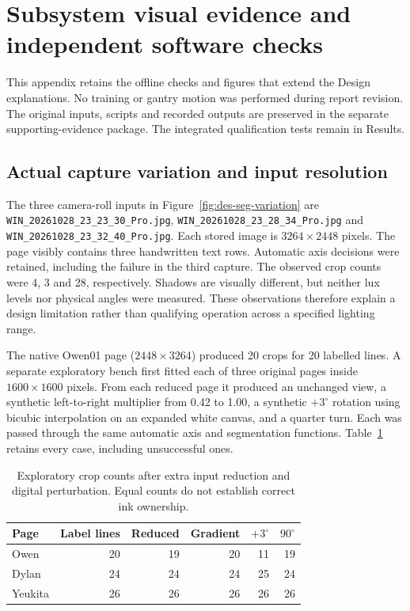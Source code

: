 \section{Subsystem visual evidence and independent software checks}
\label{app:des-visual-tests}
This appendix retains the offline checks and figures that extend the Design explanations. No training or gantry motion was performed during report revision. The original inputs, scripts and recorded outputs are preserved in the separate supporting-evidence package. The integrated qualification tests remain in Results.

\subsection{Actual capture variation and input resolution}
The three camera-roll inputs in Figure~\ref{fig:des-seg-variation} are \texttt{WIN\_20261028\_23\_23\_30\_Pro.jpg}, \texttt{WIN\_20261028\_23\_28\_34\_Pro.jpg} and \texttt{WIN\_20261028\_23\_32\_40\_Pro.jpg}. Each stored image is $3264\times2448$ pixels. The page visibly contains three handwritten text rows. Automatic axis decisions were retained, including the failure in the third capture. The observed crop counts were 4, 3 and 28, respectively. Shadows are visually different, but neither lux levels nor physical angles were measured. These observations therefore explain a design limitation rather than qualifying operation across a specified lighting range.

The native Owen01 page ($2448\times3264$) produced 20 crops for 20 labelled lines. A separate exploratory bench first fitted each of three original pages inside $1600\times1600$ pixels. From each reduced page it produced an unchanged view, a synthetic left-to-right multiplier from 0.42 to 1.00, a synthetic $+3^\circ$ rotation using bicubic interpolation on an expanded white canvas, and a quarter turn. Each was passed through the same automatic axis and segmentation functions. Table~\ref{tab:des-resample-cases} retains every case, including unsuccessful ones.

\begin{table}[!htbp]\centering\small
\begin{tabular}{lrrrrr}\hline
Page & Label lines & Reduced & Gradient & $+3^\circ$ & $90^\circ$ \\\hline
Owen & 20 & 19 & 20 & 11 & 19 \\
Dylan & 24 & 24 & 24 & 25 & 24 \\
Yeukita & 26 & 26 & 26 & 26 & 26 \\
\hline\end{tabular}
\caption{Exploratory crop counts after extra input reduction and digital perturbation. Equal counts do not establish correct ink ownership.}
\label{tab:des-resample-cases}
\end{table}

